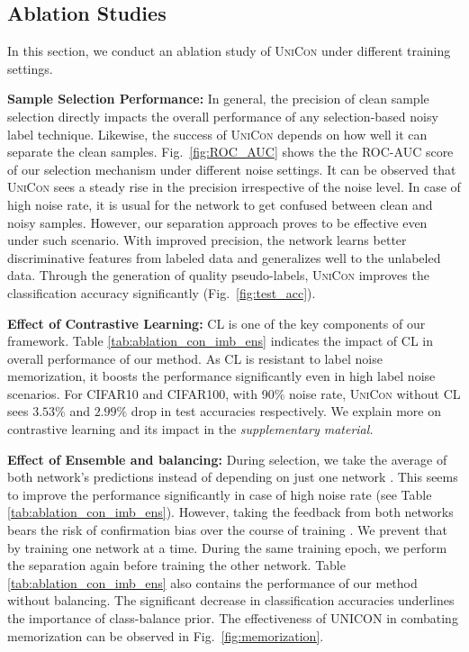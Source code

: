 \documentclass[10pt,twocolumn,letterpaper]{article}
\begin{document}
\subsection{Ablation Studies}
In this section, we conduct an ablation study of \textsc{UniCon} under different training settings.

 \textbf{Sample Selection Performance:}
In general, the precision of clean sample selection directly impacts the overall performance of any selection-based noisy label technique. Likewise, the success of \textsc{UniCon} depends on how well it can separate the clean samples. Fig.~\ref{fig:ROC_AUC} shows the the ROC-AUC score of our selection mechanism under different noise settings. It can be observed that \textsc{UniCon} sees a steady rise in the precision irrespective of the noise level. In case of high noise rate, it is usual for the network to get confused between clean and noisy samples. However, our separation approach proves to be effective even under such scenario. With improved precision, the network learns better discriminative features from labeled data and generalizes well to the unlabeled data. Through the generation of quality pseudo-labels, \textsc{UniCon} improves the classification accuracy significantly (Fig.~\ref{fig:test_acc}).   

 \textbf{Effect of Contrastive Learning:} 
CL is one of the key components of our framework. Table \ref{tab:ablation_con_imb_ens} indicates the impact of CL in overall performance of our method. As CL is resistant to label noise memorization, it boosts the performance significantly even in high label noise scenarios. For CIFAR10 and CIFAR100, with 90\% noise rate, \textsc{UniCon} without CL sees $3.53\%$ and $2.99\%$ drop in test accuracies respectively. We explain more on contrastive learning and its impact in the {\em supplementary material.}




 \textbf{Effect of Ensemble and balancing:}
During selection, we take the average of both network's predictions instead of depending on just one network \cite{han2018co}. This seems to improve the performance significantly in case of high noise rate (see Table \ref{tab:ablation_con_imb_ens}). However, taking the feedback from both networks bears the risk of confirmation bias over the course of training \cite{li2020dividemix}. We prevent that by training one network at a time. During the same training epoch, we perform the separation again before training the other network. Table \ref{tab:ablation_con_imb_ens} also contains the performance of our method without balancing. The significant decrease in classification accuracies underlines the importance of class-balance prior. The effectiveness of \textsc{UNICON} in combating memorization can be observed in Fig.~\ref{fig:memorization}.       
\end{document}
